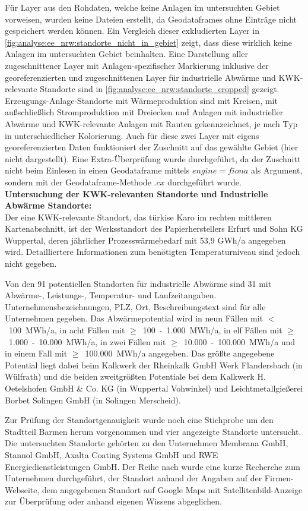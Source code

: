 		Für Layer aus den Rohdaten, welche keine Anlagen im untersuchten Gebiet vorweisen, wurden keine Dateien erstellt, da Geodataframes ohne Einträge nicht gespeichert werden können. Ein Vergleich dieser exkludierten Layer in \autoref{fig:analyse:ee_nrw:standorte_nicht_in_gebiet} zeigt, dass diese wirklich keine Anlagen im untersuchten Gebiet beinhalten. Eine Darstellung aller zugeschnittener Layer mit Anlagen-spezifischer Markierung inklusive der georeferenzierten und zugeschnittenen Layer für industrielle Abwärme und KWK-relevante Standorte sind in \autoref{fig:analyse:ee_nrw:standorte_cropped} gezeigt. Erzeugungs-Anlage-Standorte mit Wärmeproduktion sind mit Kreisen, mit außschließlich Stromproduktion mit Dreiecken und Anlagen mit industrieller Abwärme und KWK-relevante Anlagen mit Rauten gekennzeichnet, je nach Typ in unterschiedlicher Kolorierung. Auch für diese zwei Layer mit eigens georeferenzierten Daten funktioniert der Zuschnitt auf das gewählte Gebiet (hier nicht dargestellt). Eine Extra-Überprüfung wurde durchgeführt, da der Zuschnitt nicht beim Einlesen in einen Geodataframe mittels $engine=fiona$ als Argument, sondern mit der Geodataframe-Methode $.cx$ durchgeführt wurde. \\
		
		\textbf{Untersuchung der KWK-relevanten Standorte und Industrielle Abwärme Standorte:}\\
		Der eine KWK-relevante Standort, das türkise Karo im rechten mittleren Kartenabschnitt, ist der Werksstandort des Papierherstellers Erfurt und Sohn KG Wuppertal, deren jährlicher Prozesswärmebedarf mit 53,9 GWh/a angegeben wird. Detailliertere Informationen zum benötigten Temperaturniveau sind jedoch nicht gegeben.
		
		Von den 91 potentiellen Standorten für industrielle Abwärme sind 31 mit Abwärme-, Leistungs-, Temperatur- und Laufzeitangaben. Unternehmensbezeichnungen, PLZ, Ort, Beschreibungstext sind für alle Unternehmen gegeben. Das Abwärmepotential wird in neun Fällen mit $<$~100~MWh/a, in acht Fällen mit $\ge$~100~-~1.000~MWh/a, in elf Fällen mit $\ge$~1.000~-~10.000~MWh/a, in zwei Fällen mit $\ge$~10.000~-~100.000~MWh/a und in einem Fall mit $\ge$~100.000~MWh/a angegeben. Das größte angegebene Potential liegt dabei beim Kalkwerk der Rheinkalk GmbH Werk Flandersbach (in Wülfrath) und die beiden zweitgrößten Potentiale bei dem Kalkwerk H. Oetelshofen GmbH \& Co. KG (in Wuppertal Vohwinkel) und Leichtmetallgießerei Borbet Solingen GmbH (in Solingen Merscheid). 
		
		Zur Prüfung der Standortgenauigkeit wurde noch eine Stichprobe um den Stadtteil Barmen herum vorgenommen und vier angezeigte Standorte untersucht. Die untersuchten Standorte gehörten zu den Unternehmen Membrana GmbH, Stannol GmbH, Axalta Coating Systems GmbH und RWE Energiedienstleistungen GmbH. Der Reihe nach wurde eine kurze Recherche zum Unternehmen durchgeführt, der Standort anhand der Angaben auf der Firmen-Webseite, dem angegebenen Standort auf Google Maps mit Satellitenbild-Anzeige zur Überprüfung oder anhand eigenen Wissens abgeglichen. 
		
